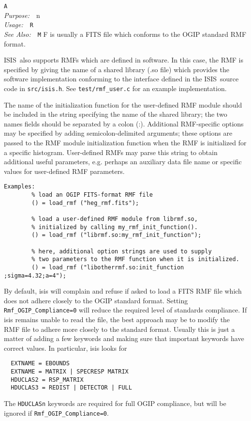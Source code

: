 \documentclass{book}
\makeatletter
\newif\ifpdf
\newcommand{\isisx}{{\sc ISIS~}}
\newenvironment{isisfunction}[4]%
{\index{{#1}@{\tt #1}}%
  \ifpdf
  \else
     \addcontentsline{toc}{subsection}{{#1} -- {#2}}
  \fi
  \vbox{
          \vspace*{\baselineskip}
          {\LARGE\tt #1}\vspace*{\baselineskip}\\
          {{\it Purpose:}~~{#2}}\\
          {{\it Usage:}~~{\tt #3}}\\
          {{\it See Also:}~~{\tt #4}}
       }
}%
{ }
\makeatother
\begin{document}
{\begin{isisfunction}
An RMF is usually a FITS file which conforms to the OGIP standard
RMF format.

\isisx also supports RMFs which are defined in software.
In this case, the RMF is specified by giving the name of a shared
library (.so file) which provides the software implementation
conforming to the interface defined in the \isisx source code in
\verb|src/isis.h|.  See \verb|test/rmf_user.c|
for an example implementation.

The name of the initialization function for the user-defined RMF
module should be included in the string specifying the name of the
shared library; the two names fields should be separated by a
colon (:).  Additional RMF-specific options may be specified
by adding semicolon-delimited arguments; these options
are passed to the RMF module initialization function when the RMF is
initialized for a specific histogram.  User-defined RMFs may parse
this string to obtain additional useful parameters, e.g. perhaps
an auxiliary data file name or specific values for user-defined
RMF parameters.

\begin{verbatim}
Examples:
        % load an OGIP FITS-format RMF file
        () = load_rmf ("heg_rmf.fits");

        % load a user-defined RMF module from librmf.so,
        % initialized by calling my_rmf_init_function().
        () = load_rmf ("librmf.so:my_rmf_init_function");

        % here, additional option strings are used to supply
        % two parameters to the RMF function when it is initialized.
        () = load_rmf ("libotherrmf.so:init_function ;sigma=4.32;a=4");
\end{verbatim}

By default, isis will complain and refuse if asked to load a
FITS RMF file which does not adhere closely to the OGIP
standard format.  Setting \verb|Rmf_OGIP_Compliance=0| will
reduce the required level of standards compliance. If isis
remains unable to read the file, the best approach may be to
modify the RMF file to adhere more closely to the standard
format.  Usually this is just a matter of adding a few keywords
and making sure that important keywords have correct values.
In particular, isis looks for
\begin{verbatim}
  EXTNAME = EBOUNDS
  EXTNAME = MATRIX | SPECRESP MATRIX
  HDUCLAS2 = RSP_MATRIX
  HDUCLAS3 = REDIST | DETECTOR | FULL
\end{verbatim}
The \verb|HDUCLASn| keywords are required for full OGIP
compliance, but will be ignored if \verb|Rmf_OGIP_Compliance=0|.


\end{isisfunction}}
\end{document}
